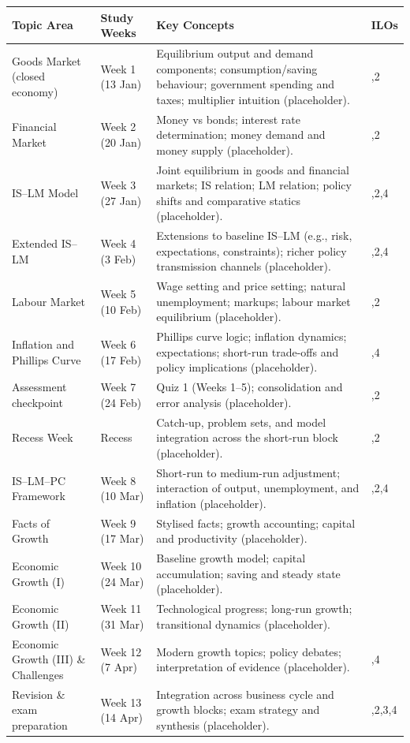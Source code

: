 \documentclass[12pt]{article}
\begin{document}
\begin{center}
\renewcommand{\arraystretch}{1.3}
\setlength{\tabcolsep}{6pt}

\begin{tabularx}{\textwidth}{
|>{\raggedright\arraybackslash}p{3.2cm}
|>{\raggedright\arraybackslash}p{1.6cm}
|>{\raggedright\arraybackslash}X
|>{\raggedright\arraybackslash}p{1.8cm}|
}
\hline
\textbf{Topic Area} & \textbf{Study Weeks} & \textbf{Key Concepts} & \textbf{ILOs} \\
\hline
Goods Market (closed economy) &
Week 1 (13 Jan) &
Equilibrium output and demand components; consumption/saving behaviour; government spending and taxes; multiplier intuition (placeholder). &
1,2 \\
\hline
Financial Market &
Week 2 (20 Jan) &
Money vs bonds; interest rate determination; money demand and money supply (placeholder). &
1,2 \\
\hline
IS--LM Model &
Week 3 (27 Jan) &
Joint equilibrium in goods and financial markets; IS relation; LM relation; policy shifts and comparative statics (placeholder). &
1,2,4 \\
\hline
Extended IS--LM &
Week 4 (3 Feb) &
Extensions to baseline IS--LM (e.g., risk, expectations, constraints); richer policy transmission channels (placeholder). &
1,2,4 \\
\hline
Labour Market &
Week 5 (10 Feb) &
Wage setting and price setting; natural unemployment; markups; labour market equilibrium (placeholder). &
1,2 \\
\hline
Inflation and Phillips Curve &
Week 6 (17 Feb) &
Phillips curve logic; inflation dynamics; expectations; short-run trade-offs and policy implications (placeholder). &
2,4 \\
\hline
Assessment checkpoint &
Week 7 (24 Feb) &
Quiz 1 (Weeks 1--5); consolidation and error analysis (placeholder). &
1,2 \\
\hline
Recess Week &
Recess &
Catch-up, problem sets, and model integration across the short-run block (placeholder). &
1,2 \\
\hline
IS--LM--PC Framework &
Week 8 (10 Mar) &
Short-run to medium-run adjustment; interaction of output, unemployment, and inflation (placeholder). &
1,2,4 \\
\hline
Facts of Growth &
Week 9 (17 Mar) &
Stylised facts; growth accounting; capital and productivity (placeholder). &
3 \\
\hline
Economic Growth (I) &
Week 10 (24 Mar) &
Baseline growth model; capital accumulation; saving and steady state (placeholder). &
3 \\
\hline
Economic Growth (II) &
Week 11 (31 Mar) &
Technological progress; long-run growth; transitional dynamics (placeholder). &
3 \\
\hline
Economic Growth (III) \& Challenges &
Week 12 (7 Apr) &
Modern growth topics; policy debates; interpretation of evidence (placeholder). &
3,4 \\
\hline
Revision \& exam preparation &
Week 13 (14 Apr) &
Integration across business cycle and growth blocks; exam strategy and synthesis (placeholder). &
1,2,3,4 \\
\hline
\end{tabularx}



\end{center}
\end{document}
